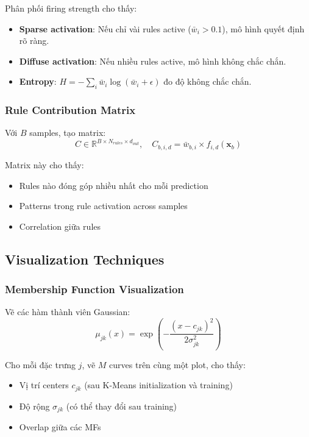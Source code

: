 \documentclass[12pt,a4paper]{article}
\begin{document}
Phân phối firing strength cho thấy:
\begin{itemize}
    \item \textbf{Sparse activation}: Nếu chỉ vài rules active ($\bar{w}_i > 0.1$), mô hình quyết định rõ ràng.
    \item \textbf{Diffuse activation}: Nếu nhiều rules active, mô hình không chắc chắn.
    \item \textbf{Entropy}: $H = -\sum_i \bar{w}_i \log(\bar{w}_i + \epsilon)$ đo độ không chắc chắn.
\end{itemize}

\subsubsection{Rule Contribution Matrix}

Với $B$ samples, tạo matrix:
\begin{equation}
C \in \mathbb{R}^{B \times N_{rules} \times d_{out}}, \quad C_{b,i,d} = \bar{w}_{b,i} \times f_{i,d}(\mathbf{x}_b)
\end{equation}

Matrix này cho thấy:
\begin{itemize}
    \item Rules nào đóng góp nhiều nhất cho mỗi prediction
    \item Patterns trong rule activation across samples
    \item Correlation giữa rules
\end{itemize}

\subsection{Visualization Techniques}

\subsubsection{Membership Function Visualization}

Vẽ các hàm thành viên Gaussian:
\begin{equation}
\mu_{jk}(x) = \exp\left(-\frac{(x - c_{jk})^2}{2\sigma_{jk}^2}\right)
\end{equation}

Cho mỗi đặc trưng $j$, vẽ $M$ curves trên cùng một plot, cho thấy:
\begin{itemize}
    \item Vị trí centers $c_{jk}$ (sau K-Means initialization và training)
    \item Độ rộng $\sigma_{jk}$ (có thể thay đổi sau training)
    \item Overlap giữa các MFs
\end{itemize}
\end{document}
